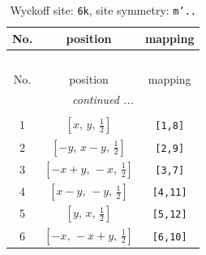 \documentclass[fleqn,8pt]{jsarticle}
\begin{document}
\renewcommand{\arraystretch}{1.2}
\begin{longtable}{ccc}
\caption{Wyckoff site: {\tt 6k}, site symmetry: {\tt m'..}}
 \\
 \hline \hline
No. & position & mapping \\ \hline \endfirsthead

\multicolumn{2}{l}{\tablename\ \thetable{}} \\
 \hline \hline
No. & position & mapping \\ \hline \endhead

 \hline \hline
\multicolumn{2}{r}{\footnotesize\it continued ...} \\ \endfoot

 \hline \hline
\multicolumn{2}{r}{} \\ \endlastfoot

1 & $\left[ x,\, y,\, \frac{1}{2} \right]$ & {\tt [1,8]} \\ \hline
2 & $\left[ - y,\, x - y,\, \frac{1}{2} \right]$ & {\tt [2,9]} \\ \hline
3 & $\left[ - x + y,\, - x,\, \frac{1}{2} \right]$ & {\tt [3,7]} \\ \hline
4 & $\left[ x - y,\, - y,\, \frac{1}{2} \right]$ & {\tt [4,11]} \\ \hline
5 & $\left[ y,\, x,\, \frac{1}{2} \right]$ & {\tt [5,12]} \\ \hline
6 & $\left[ - x,\, - x + y,\, \frac{1}{2} \right]$ & {\tt [6,10]} \\
\end{longtable}
\renewcommand{\arraystretch}{1.2}
\end{document}
